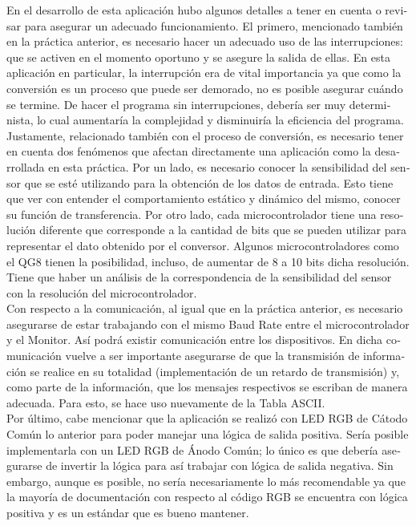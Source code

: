 \documentclass[journal]{IEEEtran}
\begin{document}
\begin{otherlanguage}{spanish}
En el desarrollo de esta aplicación hubo algunos detalles a tener en cuenta o revisar para asegurar un adecuado funcionamiento. El primero, mencionado también en la práctica anterior, es necesario hacer un adecuado uso de las interrupciones: que se activen en el momento oportuno y se asegure la salida de ellas. En esta aplicación en particular, la interrupción era de vital importancia ya que como la conversión es un proceso que puede ser demorado, no es posible asegurar cuándo se termine. De hacer el programa sin interrupciones, debería ser muy determinista, lo cual aumentaría la complejidad y disminuiría la eficiencia del programa.\\

Justamente, relacionado también con el proceso de conversión, es necesario tener en cuenta dos fenómenos que afectan directamente una aplicación como la desarrollada en esta práctica. Por un lado, es necesario conocer la sensibilidad del sensor que se esté utilizando para la obtención de los datos de entrada. Esto tiene que ver con entender el comportamiento estático y dinámico del mismo, conocer su función de transferencia. Por otro lado, cada microcontrolador tiene una resolución diferente que corresponde a la cantidad de bits que se pueden utilizar para representar el dato obtenido por el conversor. Algunos microcontroladores como el QG8 tienen la posibilidad, incluso, de aumentar de 8 a 10 bits dicha resolución. Tiene que haber un análisis de la correspondencia de la sensibilidad del sensor con la resolución del microcontrolador.\\

Con respecto a la comunicación, al igual que en la práctica anterior, es necesario asegurarse de estar trabajando con el mismo Baud Rate entre el microcontrolador y el Monitor. Así podrá existir comunicación entre los dispositivos. En dicha comunicación vuelve a ser importante asegurarse de que la transmisión de información se realice en su totalidad (implementación de un retardo de transmisión) y, como parte de la información, que los mensajes respectivos se escriban de manera adecuada. Para esto, se hace uso nuevamente de la Tabla ASCII.\\

Por último, cabe mencionar que la aplicación se realizó con LED RGB de Cátodo Común lo anterior para poder manejar una lógica de salida positiva. Sería posible implementarla con un LED RGB de Ánodo Común; lo único es que debería asegurarse de invertir la lógica para así trabajar con lógica de salida negativa. Sin embargo, aunque es posible, no sería necesariamente lo más recomendable ya que la mayoría de documentación con respecto al código RGB se encuentra con lógica positiva y es un estándar que es bueno mantener.



\end{otherlanguage}
\end{document}
